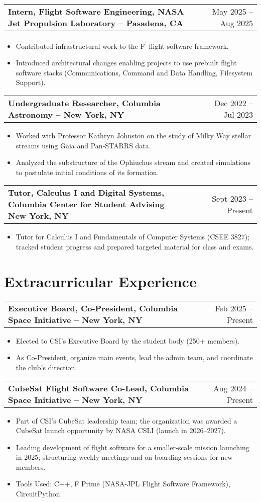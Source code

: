 \documentclass[a4paper,12pt]{article}
\makeatletter
\newenvironment{joblong}[2]
    {
    \begin{tabularx}{\linewidth}{@{}l X r@{}}
    \textbf{#1} & \hfill &  #2 \\[3.75pt]
    \end{tabularx}
    \begin{minipage}[t]{\linewidth}
    \begin{itemize}[nosep,after=\strut, leftmargin=1em, itemsep=3pt,label=--]
    }
    {
    \end{itemize}
    \end{minipage}    
    }
\makeatother
\begin{document}
\begin{joblong}{Intern, Flight Software Engineering, NASA Jet Propulsion Laboratory -- Pasadena, CA}{May 2025 -- Aug 2025}
\item Contributed infrastructural work to the F\textsuperscript{\'{}} flight software framework.
\item Introduced architectural changes enabling projects to use prebuilt flight software stacks (Communications, Command and Data Handling, Filesystem Support).
\end{joblong}

\begin{joblong}{Undergraduate Researcher, Columbia Astronomy -- New York, NY}{Dec 2022 -- Jul 2023}
\item Worked with Professor Kathryn Johnston on the study of Milky Way stellar streams using Gaia and Pan-STARRS data.
\item Analyzed the substructure of the Ophiuchus stream and created simulations to postulate initial conditions of its formation.
\end{joblong}

\begin{joblong}{Tutor, Calculus I and Digital Systems, Columbia Center for Student Advising -- New York, NY}{Sept 2023 -- Present}
\item Tutor for Calculus I and Fundamentals of Computer Systems (CSEE 3827); tracked student progress and prepared targeted material for class and exams.
\end{joblong}
  
\section{Extracurricular Experience}

\begin{joblong}{Executive Board, Co-President, Columbia Space Initiative -- New York, NY}{Feb 2025 -- Present}
\item Elected to CSI's Executive Board by the student body (250+ members).
\item As Co-President, organize main events, lead the admin team, and coordinate the club's direction.
\end{joblong}

\begin{joblong}{CubeSat Flight Software Co-Lead, Columbia Space Initiative -- New York, NY}{Aug 2024 -- Present}
\item Part of CSI's CubeSat leadership team; the organization was awarded a CubeSat launch opportunity by NASA CSLI (launch in 2026--2027).
\item Leading development of flight software for a smaller-scale mission launching in 2025; structuring weekly meetings and on-boarding sessions for new members.
\item Tools Used: C++, F Prime (NASA-JPL Flight Software Framework), CircuitPython
\end{joblong}
\end{document}
